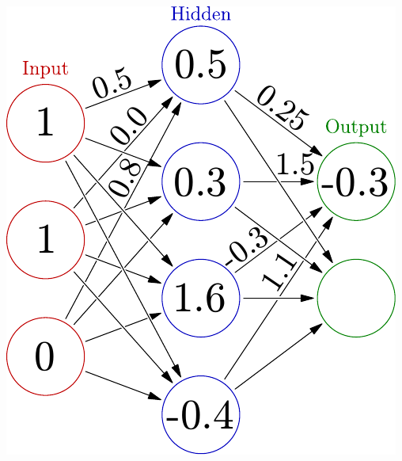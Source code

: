 \documentclass{beamer}
\begin{document}
\begin{frame}
\begin{columns}[T]
\begin{column}{.5\textwidth}
 \includegraphics[width=\linewidth]{./fig/3-layer_propagate.pdf}

    \end{column}
  \end{columns}
\end{frame}
\end{document}
